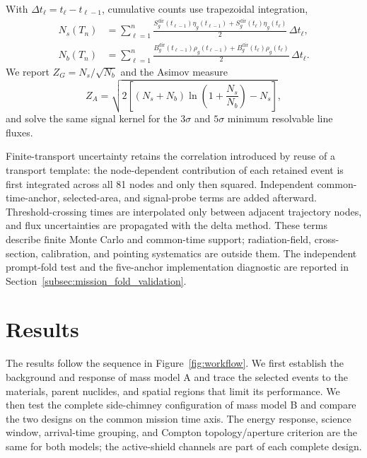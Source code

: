 \documentclass[11pt]{article}
\begin{document}
With $\Delta t_\ell=t_\ell-t_{\ell-1}$, cumulative counts use trapezoidal
integration,
\begin{equation}
 \begin{aligned}
 N_s(T_n)&=\sum_{\ell=1}^{n}\frac{S^{\mathrm{dir}}_g(t_{\ell-1})\eta_g(t_{\ell-1})+S^{\mathrm{dir}}_g(t_\ell)\eta_g(t_\ell)}{2}\,\Delta t_\ell,\\
 N_b(T_n)&=\sum_{\ell=1}^{n}\frac{B^{\mathrm{dir}}_g(t_{\ell-1})\rho_g(t_{\ell-1})+B^{\mathrm{dir}}_g(t_\ell)\rho_g(t_\ell)}{2}\,\Delta t_\ell.
 \end{aligned}
 \label{eq:cumulative_counts}
\end{equation}
We report $Z_G=N_s/\sqrt{N_b}$ and the Asimov measure
\begin{equation}
 Z_A=\sqrt{2\left[(N_s+N_b)\ln\left(1+\frac{N_s}{N_b}\right)-N_s\right]},
\end{equation}
and solve the same signal kernel for the $3\sigma$ and $5\sigma$ minimum
resolvable line fluxes.

Finite-transport uncertainty retains the correlation introduced by reuse of a
transport template: the node-dependent contribution of each retained event is
first integrated across all 81 nodes and only then squared. Independent
common-time-anchor, selected-area, and signal-probe terms are added afterward.
Threshold-crossing times are interpolated only between adjacent trajectory
nodes, and flux uncertainties are propagated with the delta method. These terms
describe finite Monte Carlo and common-time support; radiation-field,
cross-section, calibration, and pointing systematics are outside them. The
independent prompt-fold test and the five-anchor implementation diagnostic are
reported in Section~\ref{subsec:mission_fold_validation}.

\section{Results}
\label{sec:results}

The results follow the sequence in Figure~\ref{fig:workflow}. We first establish the background and response of mass model A and trace the selected events to the materials, parent nuclides, and spatial regions that limit its performance. We then test the complete side-chimney configuration of mass model B and compare the two designs on the common mission time axis. The energy response, science window, arrival-time grouping, and Compton topology/aperture criterion are the same for both models; the active-shield channels are part of each complete design.
\end{document}
